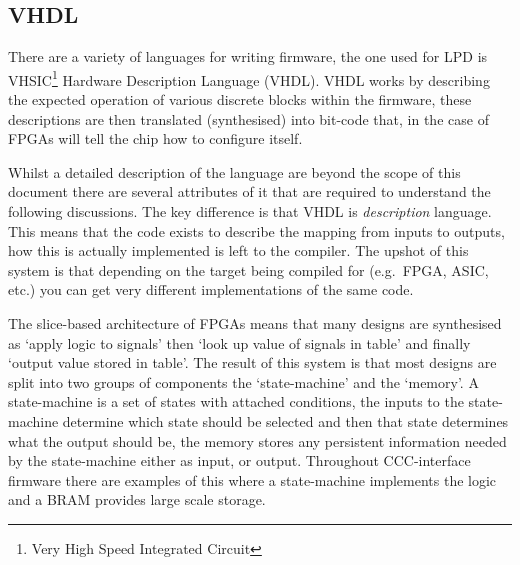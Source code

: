 \subsection{VHDL} %
\label{sub:vhdl}
There are a variety of languages for writing firmware, the one used for LPD is VHSIC\footnote{Very High Speed Integrated Circuit} Hardware Description Language (VHDL). VHDL works by describing the expected operation of various discrete blocks within the firmware, these descriptions are then translated (synthesised) into bit-code that, in the case of FPGAs will tell the chip how to configure itself.

Whilst a detailed description of the language are beyond the scope of this document there are several attributes of it that are required to understand the following discussions. The key difference is that VHDL is \emph{description} language. This means that the code exists to describe the mapping from inputs to outputs, how this is actually implemented is left to the compiler. The upshot of this system is that depending on the target being compiled for (e.g.\ FPGA, ASIC, etc.) you can get very different implementations of the same code.


The slice-based architecture of FPGAs means that many designs are synthesised as `apply logic to signals' then `look up value of signals in table' and finally `output value stored in table'. The result of this system is that most designs are split into two groups of components the `state-machine' and the `memory'. A state-machine is a set of states with attached conditions, the inputs to the state-machine determine which state should be selected and then that state determines what the output should be, the memory stores any persistent information needed by the state-machine either as input, or output. Throughout CCC-interface firmware there are examples of this where a state-machine implements the logic and a BRAM provides large scale storage.

